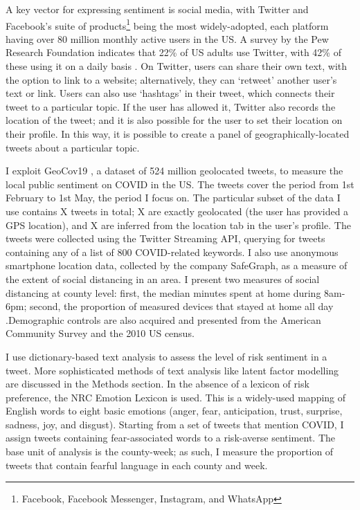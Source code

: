 \documentclass{article}
\begin{document}
A key vector for expressing sentiment is social media, with Twitter and Facebook's suite of products\footnote{Facebook, Facebook Messenger, Instagram, and WhatsApp} being the most widely-adopted, each platform having over 80 million monthly active users in the US. A survey by the Pew Research Foundation indicates that 22\% of US adults use Twitter, with 42\% of these using it on a daily basis \parencite{perrinShareAdultsUsing2019}. On Twitter, users can share their own text, with the option to link to a website; alternatively, they can `retweet' another user's text or link. Users can also use `hashtags' in their tweet, which connects their tweet to a particular topic. If the user has allowed it, Twitter also records the location of the tweet; and it is also possible for the user to set their location on their profile. In this way, it is possible to create a panel of geographically-located tweets about a particular topic. 

I exploit GeoCov19 \parencite{qaziGeoCoV19DatasetHundreds2020a}, a dataset of 524 million geolocated tweets, to measure the local public sentiment on COVID in the US. The tweets cover the period from 1st February to 1st May, the period I focus on. The particular subset of the data I use contains X tweets in total; X are exactly geolocated (the user has provided a GPS location), and X are inferred from the location tab in the user's profile. The tweets were collected using the Twitter Streaming API, querying for tweets containing any of a list of 800 COVID-related keywords. I also use anonymous smartphone location data, collected by the company SafeGraph, as a measure of the extent of social distancing in an area. I present two measures of social distancing at county level: first, the median minutes spent at home during 8am-6pm; second, the proportion of measured devices that stayed at home all day \parencite{safegraphinc.SocialDistancingMetrics2020}.Demographic controls are also acquired and presented from the American Community Survey and the 2010 US census. 

I use dictionary-based text analysis to assess the level of risk sentiment in a tweet. More sophisticated methods of text analysis like latent factor modelling are discussed in the Methods section. In the absence of a lexicon of risk preference, the NRC Emotion Lexicon \parencite{mohammadCrowdsourcingWordEmotion2013} is used. This is a widely-used mapping of English words to eight basic emotions (anger, fear, anticipation, trust, surprise, sadness, joy, and disgust). Starting from a set of tweets that mention COVID, I assign tweets containing fear-associated words to a risk-averse sentiment. The base unit of analysis is the county-week; as such, I measure the proportion of tweets that contain fearful language in each county and week. 
\end{document}
